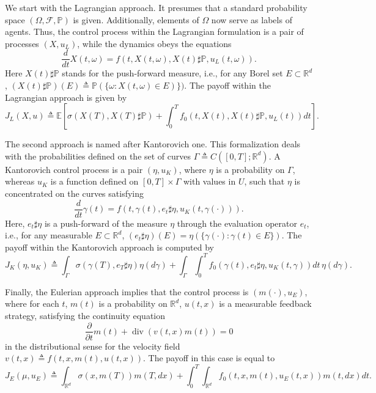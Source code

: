 \documentclass[12pt]{llncs}
\newcommand{\rd}{\mathbb{R}^d}
\newcommand{\pp}{\mathbb{P}}
\begin{document}
We start with the Lagrangian approach. It presumes that a standard probability space $(\Omega,\mathcal{F},\pp)$ is given. Additionally, elements of $\Omega$ now serve as labels of agents. Thus, the control process within the Lagrangian formulation is a pair of processes $(X,u_L)$, while the dynamics obeys the equations
\[\frac{d}{dt}X(t,\omega)=f(t,X(t,\omega), X(t)\sharp \pp, u_L(t,\omega)).\] Here $X(t)\sharp\pp$ stands for the push-forward measure, i.e., for any Borel set $E\subset\rd$, $(X(t)\sharp\pp)(E)\triangleq \pp(\{\omega:X(t,\omega)\in E)\})$.
The payoff within the Lagrangian approach is given by 
\[J_L(X,u)\triangleq \mathbb{E}\left[\sigma(X(T),X(T)\sharp \pp)+\int_0^T f_0(t,X(t),X(t)\sharp \pp,u_L(t))dt\right].\]

The second approach is named after Kantorovich one. This formalization deals with the probabilities defined on the set of curves $\Gamma\triangleq C([0,T];\rd)$. A Kantorovich control process is a pair $(\eta,u_K)$, where $\eta$ is a probability on $\Gamma$, whereas $u_K$ is a function defined on  $[0,T]\times\Gamma$ with values in $U$, such that $\eta$ is concentrated on the curves satisfying
\[\frac{d}{dt}\gamma(t)=f(t,\gamma(t),e_t\sharp \eta,u_K(t,\gamma(\cdot))).\] Here, $e_t\sharp\eta$ is a push-forward of the measure $\eta$ through the evaluation operator $e_t$, i.e., for any measurable $E\subset\rd$, $(e_t\sharp\eta)(E)=\eta(\{\gamma(\cdot):\gamma(t)\in E\})$. 
The payoff within the Kantorovich approach is computed by
  \[J_K(\eta,u_K)\triangleq \int_{\Gamma}\sigma(\gamma(T),e_T\sharp \eta)\eta(d\gamma)+\int_\Gamma\int_0^T f_0(\gamma(t),e_t\sharp \eta,u_K(t,\gamma))  dt \,\eta(d\gamma).\]

Finally, the Eulerian approach implies that the control process is $(m(\cdot),u_E)$, where for each $t$, $m(t)$ is a probability on $\rd$, $u(t,x)$ is a measurable feedback strategy, satisfying the continuity equation
\[\frac{\partial}{\partial t}m(t)+\operatorname{div}(v(t,x)m(t))=0\] in the distributional sense for the velocity field $v(t,x)\triangleq f(t,x,m(t),u(t,x))$. The payoff in this case is equal to
\[J_E(\mu,u_E)\triangleq \int_{\rd}\sigma(x,m(T))m(T,dx)+ \int_0^T\int_{\rd} f_0(t,x,m(t),u_E(t,x)) m(t,dx)dt.\]
\end{document}
